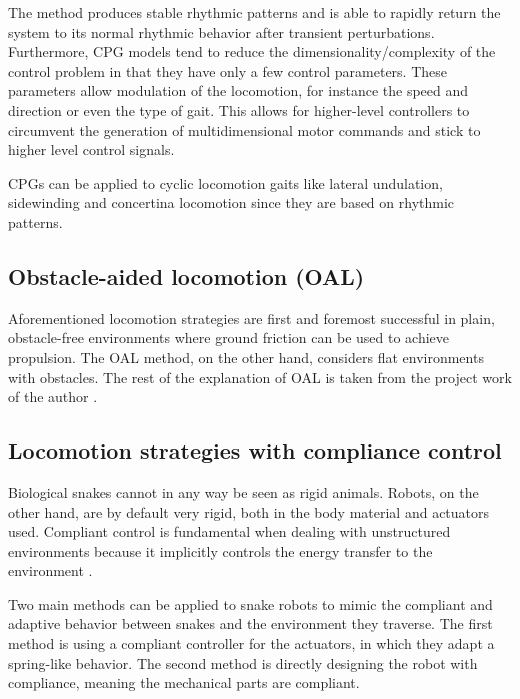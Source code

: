 The method produces stable rhythmic patterns and is able to rapidly return the system to its normal rhythmic behavior after transient perturbations. Furthermore, CPG models tend to reduce the dimensionality/complexity of the control problem in that they have only a few control parameters. These parameters allow modulation of the locomotion, for instance the speed and direction or even the type of gait. This allows for higher-level controllers to circumvent the generation of multidimensional motor commands and stick to higher level control signals.

CPGs can be applied to cyclic locomotion gaits like lateral undulation, sidewinding and concertina locomotion since they are based on rhythmic patterns.

\subsection{Obstacle-aided locomotion (OAL)}\label{subsec:OAL}

Aforementioned locomotion strategies are first and foremost successful in plain, obstacle-free environments where ground friction can be used to achieve propulsion. The OAL method, on the other hand, considers flat environments with obstacles. The rest of the explanation of OAL is taken from the project work of the author \cite{AtussaProsjektoppgp}.





\subsection{Locomotion strategies with compliance control}\label{subsec:compliance-control}

Biological snakes cannot in any way be seen as rigid animals. Robots, on the other hand, are by default very rigid, both in the body material and actuators used.
Compliant control is fundamental when dealing with unstructured environments because it implicitly controls the energy transfer to the environment \cite{calanca2015review}.

Two main methods can be applied to snake robots to mimic the compliant and adaptive behavior between snakes and the environment they traverse. The first method is using a compliant controller for the actuators, in which they adapt a spring-like behavior. The second method is directly designing the robot with compliance, meaning the mechanical parts are compliant.


